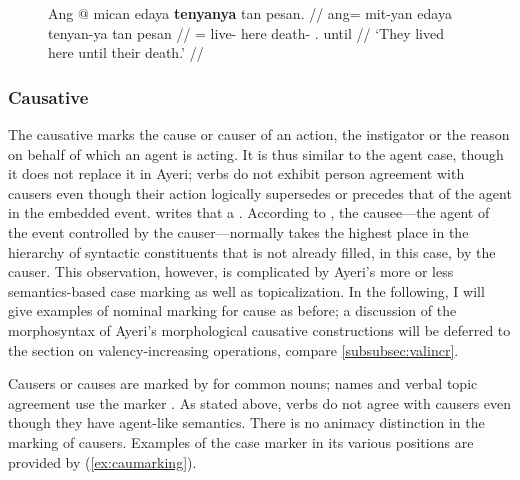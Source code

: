 \begin{figure}[h]
\ex\label{ex:locpostpos}%
\begingl
	\gla Ang @ mican edaya \textbf{tenyanya} tan pesan. //
	\glb ang= mit-yan edaya tenyan-ya tan pesan //
	\glc \AgtT{}= live-\TplM{} here death-\Loc{} \TplM{}.\Gen{} until //
	\glft `They lived here until their death.' //
\endgl\xe
\end{figure}


\subsubsection{Causative}
\label{subsubsec:causative}

The causative marks the cause or causer of an action, the instigator or the
reason on behalf of which an agent is acting. It is thus similar to the agent
case, though it does not replace it in Ayeri; verbs do not exhibit person
agreement with causers even though their action logically supersedes or
precedes that of the agent in the embedded event. \citet{dixon2000} writes that
a .
According to \citet[176]{comrie1989}, the causee---the agent of the event
controlled by the causer---normally takes the highest place in the hierarchy of
syntactic constituents that is not already filled, in this case, by the causer.
This observation, however, is complicated by Ayeri's more or less
semantics-based case marking as well as topicalization. In the following, I
will give examples of nominal marking for cause as before; a discussion of the
morphosyntax of Ayeri's morphological causative constructions will be deferred
to the section on valency-increasing operations, compare
\autoref{subsubsec:valincr}.

Causers or causes are marked by  for common nouns; names and
verbal topic agreement use the marker . As stated above, verbs do
not agree with causers even though they have agent-like semantics. There is no
animacy distinction in the marking of causers. Examples of the case marker in
its various positions are provided by (\ref{ex:caumarking}).

